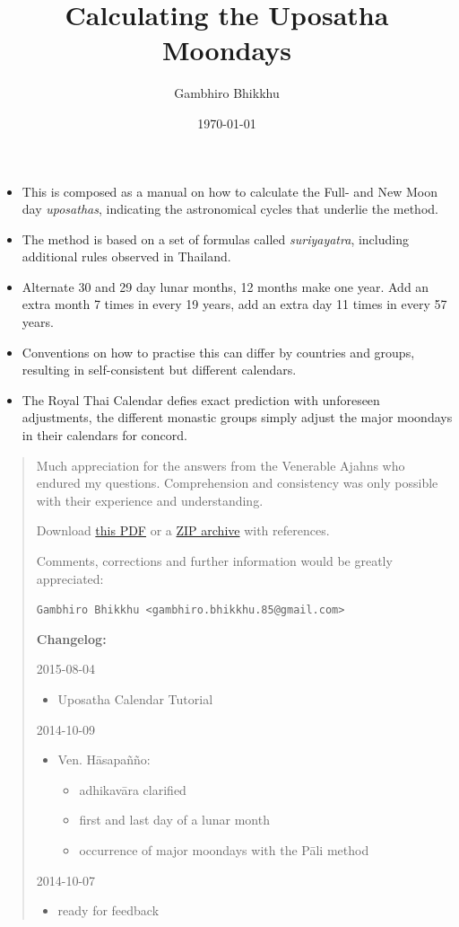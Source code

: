 \documentclass[11pt,oneside]{memoir-article}
\author{Gambhiro Bhikkhu}
\date{\today}
\title{Calculating the Uposatha Moondays}
\begin{document}
\maketitle
\begin{tldr}
\begin{itemize}
\item This is composed as a manual on how to calculate the Full- and New
Moon day \emph{uposathas}, indicating the astronomical cycles that
underlie the method.
\item The method is based on a set of formulas called \emph{suriyayatra},
including additional rules observed in Thailand.
\item Alternate 30 and 29 day lunar months, 12 months make one year. Add
an extra month 7 times in every 19 years, add an extra day 11 times
in every 57 years.
\item Conventions on how to practise this can differ by countries and
groups, resulting in self-consistent but different calendars.
\item The Royal Thai Calendar defies exact prediction with unforeseen
adjustments, the different monastic groups simply adjust the major
moondays in their calendars for concord.
\end{itemize}
\end{tldr}

\begin{quote}
Much appreciation for the answers from the Venerable Ajahns who
endured my questions. Comprehension and consistency was only possible
with their experience and understanding.

Download \href{https://github.com/profound-labs/calculating-the-uposatha-moondays/raw/master/calculating-the-uposatha-moondays.pdf}{this PDF} or a \href{https://github.com/profound-labs/calculating-the-uposatha-moondays/archive/master.zip}{ZIP archive} with references.

Comments, corrections and further information would be greatly
appreciated:

\texttt{Gambhiro Bhikkhu <gambhiro.bhikkhu.85@gmail.com>}

\textbf{Changelog:}

2015-08-04
\begin{itemize}
\item Uposatha Calendar Tutorial
\end{itemize}
2014-10-09
\begin{itemize}
\item Ven. Hāsapañño:
\begin{itemize}
\item adhikavāra clarified
\item first and last day of a lunar month
\item occurrence of major moondays with the Pāli method
\end{itemize}
\end{itemize}
2014-10-07
\begin{itemize}
\item ready for feedback
\end{itemize}
\end{quote}
\end{document}
